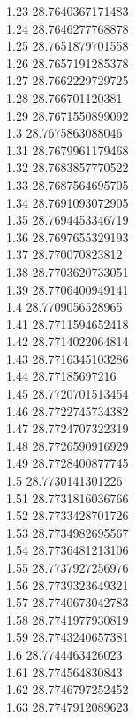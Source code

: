 {1.23	28.7640367171483\\
1.24	28.7646277768878\\
1.25	28.7651879701558\\
1.26	28.7657191285378\\
1.27	28.7662229729725\\
1.28	28.766701120381\\
1.29	28.7671550899092\\
1.3	28.7675863088046\\
1.31	28.7679961179468\\
1.32	28.7683857770522\\
1.33	28.7687564695705\\
1.34	28.7691093072905\\
1.35	28.7694453346719\\
1.36	28.7697655329193\\
1.37	28.770070823812\\
1.38	28.7703620733051\\
1.39	28.7706400949141\\
1.4	28.7709056528965\\
1.41	28.7711594652418\\
1.42	28.7714022064814\\
1.43	28.7716345103286\\
1.44	28.77185697216\\
1.45	28.7720701513454\\
1.46	28.7722745734382\\
1.47	28.7724707322319\\
1.48	28.7726590916929\\
1.49	28.7728400877745\\
1.5	28.7730141301226\\
1.51	28.7731816036766\\
1.52	28.7733428701726\\
1.53	28.7734982695567\\
1.54	28.7736481213106\\
1.55	28.7737927256976\\
1.56	28.7739323649321\\
1.57	28.7740673042783\\
1.58	28.7741977930819\\
1.59	28.7743240657381\\
1.6	28.7744463426023\\
1.61	28.774564830843\\
1.62	28.7746797252452\\
1.63	28.7747912089623\\
}
